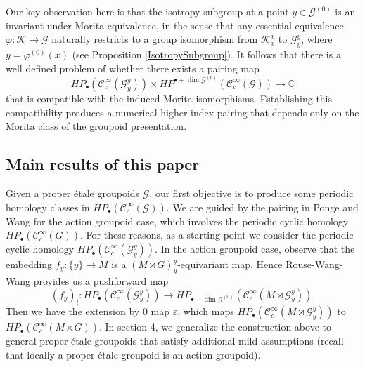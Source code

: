 \documentclass[a4paper]{amsart}
\newcommand{\CC}{\mathbb C}
\newcommand{\maC}{\mathcal C}
\newcommand{\maG}{\mathcal G}
\newcommand{\maK}{\mathcal K}
\newcommand\<{\langle}
\renewcommand\>{\rangle}
\theoremstyle{definition}
\theoremstyle{remark}
\begin{document}
Our key observation here is that the isotropy subgroup at a point $y \in \maG ^{(0)}$ is an invariant under Morita equivalence,
in the sense that any essential equivalence $\varphi : \maK \to \maG$ naturally restricts to a group isomorphism
from $\maK _x ^x$ to $\maG _y ^y$, where $y = \varphi ^{(0)} (x)$ (see Proposition \ref{IsotropySubgroup}).
It follows that there is a well defined problem of whether there exists a pairing map
$$ H P _\bullet (\maC^\infty _c (\maG _y ^y)) \times H P ^{\bullet + \dim \maG ^{(0)}} (\maC _c ^\infty (\maG)) \to \CC $$
that is compatible with the induced Morita isomorphisms.
Establishing this compatibility produces a numerical higher
index pairing that depends only on the Morita class of the groupoid presentation.

\subsection{Main results of this paper}
Given a proper \'etale groupoids
$\maG$,
our first objective is to produce some periodic homology classes in $H P _\bullet (\maC^\infty _c (\maG))$.
We are guided by the pairing in Ponge and Wang \cite{PW18} for the action groupoid case,
which involves the periodic cyclic homology $H P _\bullet (\maC^\infty _c (G))$.
For these reasons, as a starting point we consider the periodic cyclic homology $H P _\bullet (\maC^\infty _c (\maG ^y_y))$.
In the action groupoid case, observe that the embedding $f _y : \{ y \} \to M$ is a $(M \rtimes G)^y_y$-equivariant map.
Hence Rouse-Wang-Wang \cite{CRWW23} provides us a pushforward map
$$(f_y)_! : H P _\bullet (\maC^\infty _c (\maG ^y_y)) \to H P _{\bullet + \dim \maG ^{(0)}} (\maC^\infty _c (M \rtimes \maG ^y_y)) .$$
Then we have the extension by 0 map $\varepsilon$,
which maps $H P _\bullet (\maC^\infty _c (M \rtimes \maG ^y_y))$ to $H P _\bullet (\maC^\infty _c (M \rtimes G))$.
In section 4, we generalize the construction above to general proper \'etale groupoids that satisfy additional mild assumptions
(recall that locally a proper \'etale groupoid is an action groupoid).
\end{document}
